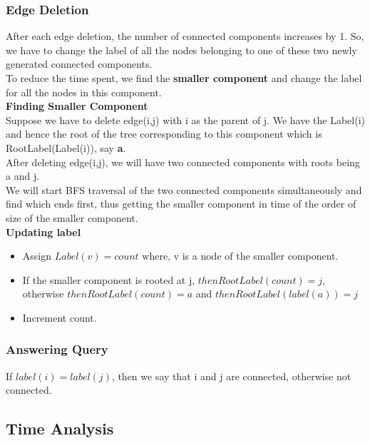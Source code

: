 \documentclass{article}
\begin{document}
\subsubsection{Edge Deletion}
After each edge deletion, the number of connected components increases by 1. So, we have to change the label of all the nodes belonging to one of these two newly generated connected components.\\
To reduce the time spent, we find the {\bf smaller component} and change the label for all the nodes in this component.\\

\textbf{Finding Smaller Component} \\
Suppose we have to delete edge(i,j) with i as the parent of j. We have the Label(i) and hence the root of the tree corresponding to this component which is RootLabel(Label(i)), say {\bf a}. \\
After deleting edge(i,j), we will have two connected components with roots being a and j. \\
We will start BFS traversal of the two connected components simultaneously and find which ends first, thus getting the smaller component in time of the order of size of the smaller component.\\

\textbf{Updating label}
\begin{itemize}
\item Assign $Label(v) = count$ where, v is a node of the smaller component.
\item If the smaller component is rooted at j, $then RootLabel(count)=j$, otherwise $then RootLabel(count)=a$ and $then RootLabel(label(a))=j$
\item Increment count.
\end{itemize}

\subsubsection{Answering Query}
If $label(i)=label(j)$, then we say that i and j are connected, otherwise not connected. 

\subsection{Time Analysis}
\end{document}
